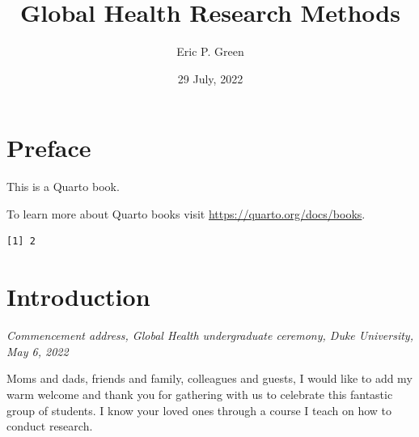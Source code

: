 \documentclass[
  letterpaper,
  DIV=11,
  numbers=noendperiod,
  oneside]{scrreprt}
\title{Global Health Research Methods}
\author{Eric P. Green}
\date{29 July, 2022}
\renewcommand*\contentsname{Table of contents}
\newcommand\contentsname{Table of contents}
\begin{document}
\maketitle
\ifdefined\Shaded\renewenvironment{Shaded}{\begin{tcolorbox}[interior hidden, boxrule=0pt, breakable, frame hidden, sharp corners, enhanced, borderline west={3pt}{0pt}{shadecolor}]}{\end{tcolorbox}}\fi

\renewcommand*\contentsname{Table of contents}
{
\hypersetup{linkcolor=}
\setcounter{tocdepth}{2}
\tableofcontents
}
\hypertarget{preface}{%
\chapter*{Preface}\label{preface}}

This is a Quarto book.

To learn more about Quarto books visit
\url{https://quarto.org/docs/books}.

\begin{verbatim}
[1] 2
\end{verbatim}

\hypertarget{introduction}{%
\chapter*{Introduction}\label{introduction}}

\emph{Commencement address, Global Health undergraduate ceremony, Duke
University, May 6, 2022}


Moms and dads, friends and family, colleagues and guests, I would like
to add my warm welcome and thank you for gathering with us to celebrate
this fantastic group of students. I know your loved ones through a
course I teach on how to conduct research.
\end{document}
